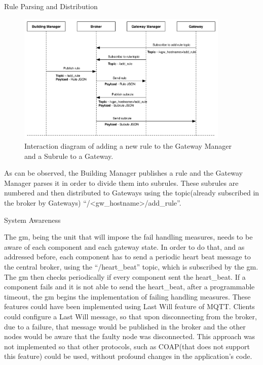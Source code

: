 \begin{Paragraph}{Rule Parsing and Distribution}
\begin{figure}[H]
	\centering
	\includegraphics[width=0.9\textwidth]{figures/addrule.png}
	\caption{Interaction diagram of adding a new rule to the Gateway Manager and a Subrule to a Gateway.}
	\label{fig:addrule}
\end{figure}

As can be observed, the Building Manager publishes a rule and the Gateway Manager parses it in order to divide them into subrules. These subrules are numbered and then distributed to Gateways using the topic(already subscribed in the broker by Gateways) ``/<gw\_hostname>/add\_rule''.

\end{Paragraph}

\begin{Paragraph}{System Awareness}

The \ac{gm}, being the unit that will impose the fail handling measures, needs to be aware of each component and each gateway state. In order to do that, and as addressed before, each component has to send a periodic heart beat message to the central broker, using the ``/heart\_beat'' topic, which is subscribed by the \ac{gm}. The \ac{gm} then checks periodically if every component sent the heart\_beat. If a component fails and it is not able to send the heart\_beat, after a programmable timeout, the \ac{gm} begins the implementation of failing handling measures. These features could have been implemented using Last Will feature of MQTT. Clients could configure a Last Will message, so that upon disconnecting from the broker, due to a failure, that message would be published in the broker and the other nodes would be aware that the faulty node was disconnected. This approach was not implemented so that other protocols, such as COAP(that does not support this feature) could be used, without profound changes in the application's code.

\end{Paragraph}

